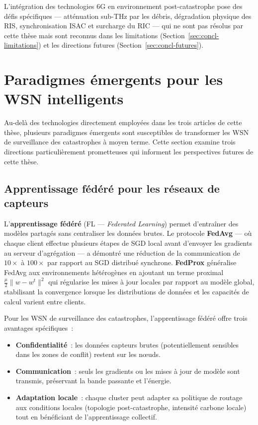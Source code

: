 L'intégration des technologies 6G en environnement post-catastrophe pose des défis spécifiques --- atténuation sub-THz par les débris, dégradation physique des RIS, synchronisation ISAC et surcharge du RIC --- qui ne sont pas résolus par cette thèse mais sont reconnus dans les limitations (Section~\ref{sec:concl-limitations}) et les directions futures (Section~\ref{sec:concl-futures}).


\section{Paradigmes émergents pour les WSN intelligents}\label{sec:revlit-emerging}

Au-delà des technologies directement employées dans les trois articles de cette thèse, plusieurs paradigmes émergents sont susceptibles de transformer les WSN de surveillance des catastrophes à moyen terme. Cette section examine trois directions particulièrement prometteuses qui informent les perspectives futures de cette thèse.

\subsection{Apprentissage fédéré pour les réseaux de capteurs}

L'\textbf{apprentissage fédéré} (FL --- \emph{Federated Learning}) permet d'entraîner des modèles partagés sans centraliser les données brutes. Le protocole \textbf{FedAvg} \cite{McMahan2017FedAvg} --- où chaque client effectue plusieurs étapes de SGD local avant d'envoyer les gradients au serveur d'agrégation --- a démontré une réduction de la communication de $10\times$ à $100\times$ par rapport au SGD distribué synchrone. \textbf{FedProx} \cite{Li2020FedProx} généralise FedAvg aux environnements hétérogènes en ajoutant un terme proximal $\frac{\mu}{2} \|w - w^t\|^2$ qui régularise les mises à jour locales par rapport au modèle global, stabilisant la convergence lorsque les distributions de données et les capacités de calcul varient entre clients.

Pour les WSN de surveillance des catastrophes, l'apprentissage fédéré offre trois avantages spécifiques~:
\begin{itemize}
    \item \textbf{Confidentialité}~: les données capteurs brutes (potentiellement sensibles dans les zones de conflit) restent sur les n\oe{}uds.
    \item \textbf{Communication}~: seuls les gradients ou les mises à jour de modèle sont transmis, préservant la bande passante et l'énergie.
    \item \textbf{Adaptation locale}~: chaque cluster peut adapter sa politique de routage aux conditions locales (topologie post-catastrophe, intensité carbone locale) tout en bénéficiant de l'apprentissage collectif.
\end{itemize}

